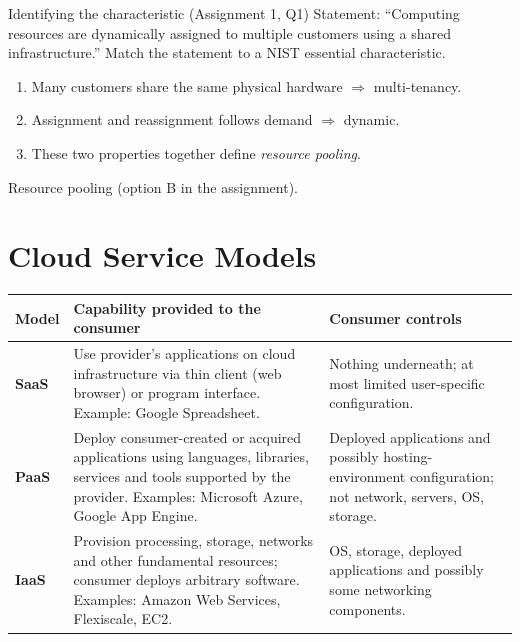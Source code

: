 \begin{solved}{Identifying the characteristic (Assignment 1, Q1)}
\Given Statement: ``Computing resources are dynamically assigned to multiple customers using a
shared infrastructure.''
\Formula Match the statement to a NIST essential characteristic.
\Steps
\begin{enumerate}[leftmargin=*]
  \item Many customers share the same physical hardware $\Rightarrow$ multi-tenancy.
  \item Assignment and reassignment follows demand $\Rightarrow$ dynamic.
  \item These two properties together define \emph{resource pooling}.
\end{enumerate}
\Answer Resource pooling (option B in the assignment).
\end{solved}

\section{Cloud Service Models}
\begin{center}
\begin{tabularx}{\textwidth}{>{\bfseries}lXX}
\toprule
Model & Capability provided to the consumer & Consumer controls\\
\midrule
SaaS & Use provider's applications on cloud infrastructure via thin client (web browser) or
program interface. Example: Google Spreadsheet. & Nothing underneath; at most limited user-specific
configuration.\\
PaaS & Deploy consumer-created or acquired applications using languages, libraries, services and
tools supported by the provider. Examples: Microsoft Azure, Google App Engine. & Deployed
applications and possibly hosting-environment configuration; not network, servers, OS, storage.\\
IaaS & Provision processing, storage, networks and other fundamental resources; consumer deploys
arbitrary software. Examples: Amazon Web Services, Flexiscale, EC2. & OS, storage, deployed
applications and possibly some networking components.\\
\bottomrule
\end{tabularx}
\end{center}

